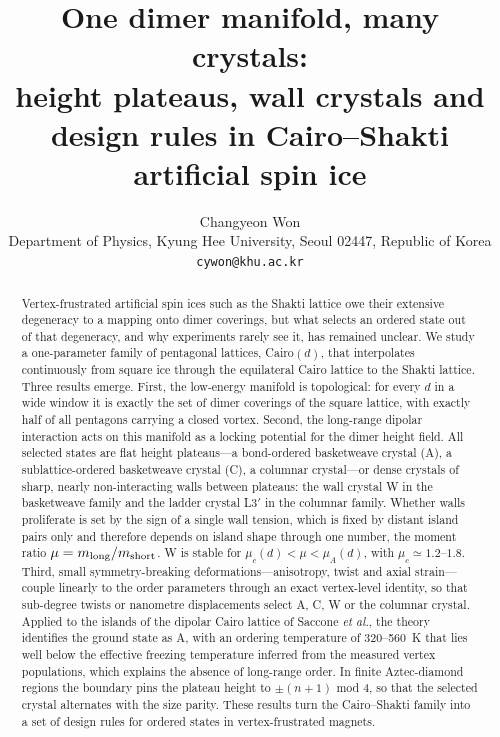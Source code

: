 \documentclass[10pt,twoside]{article}
\title{\textbf{One dimer manifold, many crystals:\\ height plateaus, wall crystals and design rules in Cairo--Shakti artificial spin ice}}
\author{Changyeon Won\\[2pt]
\small Department of Physics, Kyung Hee University, Seoul 02447, Republic of Korea\\
\small \texttt{cywon@khu.ac.kr}}
\date{}
\begin{document}
\maketitle

\begin{abstract}
\noindent
Vertex-frustrated artificial spin ices such as the Shakti lattice owe their extensive degeneracy to a mapping onto dimer coverings, but what selects an ordered state out of that degeneracy, and why experiments rarely see it, has remained unclear. We study a one-parameter family of pentagonal lattices, Cairo$(d)$, that interpolates continuously from square ice through the equilateral Cairo lattice to the Shakti lattice. Three results emerge. First, the low-energy manifold is topological: for every $d$ in a wide window it is exactly the set of dimer coverings of the square lattice, with exactly half of all pentagons carrying a closed vortex. Second, the long-range dipolar interaction acts on this manifold as a locking potential for the dimer height field. All selected states are flat height plateaus---a bond-ordered basketweave crystal (A), a sublattice-ordered basketweave crystal (C), a columnar crystal---or dense crystals of sharp, nearly non-interacting walls between plateaus: the wall crystal W in the basketweave family and the ladder crystal L3$'$ in the columnar family. Whether walls proliferate is set by the sign of a single wall tension, which is fixed by distant island pairs only and therefore depends on island shape through one number, the moment ratio $\mu=m_{\rm long}/m_{\rm short}$. W is stable for $\mu_c(d)<\mu<\mu_A(d)$, with $\mu_c\simeq1.2$--$1.8$. Third, small symmetry-breaking deformations---anisotropy, twist and axial strain---couple linearly to the order parameters through an exact vertex-level identity, so that sub-degree twists or nanometre displacements select A, C, W or the columnar crystal. Applied to the islands of the dipolar Cairo lattice of Saccone \emph{et al.}, the theory identifies the ground state as A, with an ordering temperature of 320--560~K that lies well below the effective freezing temperature inferred from the measured vertex populations, which explains the absence of long-range order. In finite Aztec-diamond regions the boundary pins the plateau height to $\pm(n+1)$ mod 4, so that the selected crystal alternates with the size parity. These results turn the Cairo--Shakti family into a set of design rules for ordered states in vertex-frustrated magnets.
\end{abstract}
\end{document}
